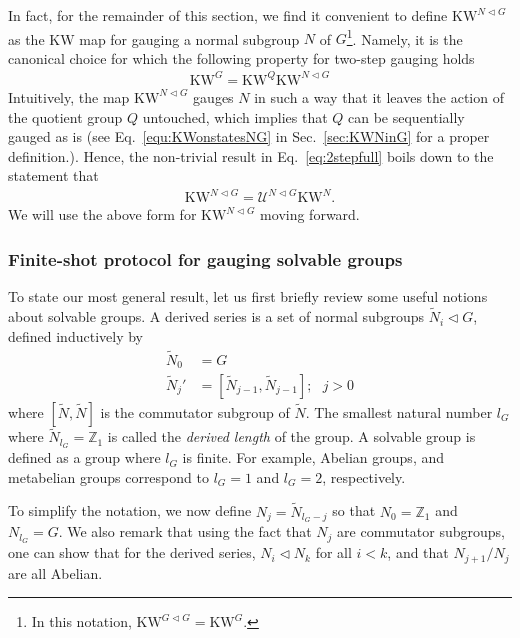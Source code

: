 \documentclass[nofootinbib,prx,twocolumn,showpacs,superscriptaddress,notitlepage,amsmath,amssymb]{revtex4-2}
\theoremstyle{definition}
\def\KW{\text{KW}}
\def\ZZ{\mathbb Z}
\begin{document}
In fact, for the remainder of this section, we find it convenient to define $\KW^{N \triangleleft G}$ as the KW map for gauging a normal subgroup $N$ of $G$\footnote{In this notation, $\KW^{G\triangleleft G} = \KW^G$.}. Namely, it is the canonical choice for which the following property for two-step gauging holds
\begin{align}
    \KW^G = \KW^Q \KW^{N \triangleleft G}
    \label{eq:2step}
\end{align}
Intuitively, the map $\KW^{N \triangleleft G}$ gauges $N$ in such a way that it leaves the action of the quotient group $Q$ untouched, which implies that $Q$ can be sequentially gauged as is (see Eq.~\eqref{equ:KWonstatesNG} in Sec.~\ref{sec:KWNinG} for a proper definition.). Hence, the non-trivial result in Eq.~\eqref{eq:2stepfull} boils down to the statement that
\begin{align}
    \KW^{N \triangleleft G} = \mathcal U^{N \triangleleft G} \KW^N. \label{eq:KWNGdef}
\end{align}
We will use the above form for $\KW^{N \triangleleft G}$ moving forward.

\subsubsection{Finite-shot protocol for gauging solvable groups}

To state our most general result, let us first briefly review some useful notions about solvable groups. A derived series is a set of normal subgroups $\tilde N_i \triangleleft G$,  defined inductively by
\begin{equation}
\begin{split}
    \tilde N_0 &= G\\
    \tilde N_j' &= [\tilde N_{j-1},\tilde N_{j-1}] ; \ \ \ j>0
    \label{eq:derivedseries}
    \end{split}
\end{equation}
where $[\tilde N,\tilde N]$ is the commutator subgroup of $\tilde N$. The smallest natural number $l_G$ where $\tilde N_{l_G}= \ZZ_1$ is called the \textit{derived length} of the group. A solvable group is defined as a group where $l_G$ is finite. For example, Abelian groups, and metabelian groups correspond to $l_G=1$ and $l_G=2$, respectively.

To simplify the notation, we now define $N_j = \tilde N_{l_G-j}$ so that $N_0=\ZZ_1$ and $N_{l_G}=G$. We also remark that using the fact that $N_j$ are commutator subgroups, one can show that for the derived series, $N_i \triangleleft N_k$ for all $i<k$, and that $N_{j+1}/N_j$ are all Abelian.
\end{document}
